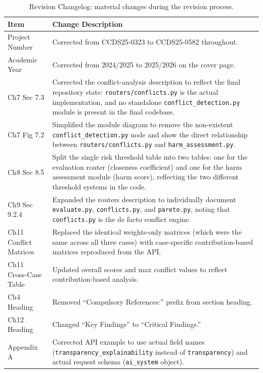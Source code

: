\begin{table}[H]
\centering
\caption{Revision Changelog: material changes during the revision process.}
\label{tab:changelog}
\begin{tabularx}{\textwidth}{@{}lX@{}}
\toprule
\textbf{Item} & \textbf{Change Description} \\
\midrule
Project Number & Corrected from CCDS25-0323 to CCDS25-0582 throughout. \\
\addlinespace
Academic Year & Corrected from 2024/2025 to 2025/2026 on the cover page. \\
\addlinespace
Ch7 Sec 7.3 & Corrected the conflict-analysis description to reflect the final repository state: \texttt{routers/conflicts.py} is the actual implementation, and no standalone \texttt{conflict\_detection.py} module is present in the final codebase. \\
\addlinespace
Ch7 Fig 7.2 & Simplified the module diagram to remove the non-existent \texttt{conflict\_detection.py} node and show the direct relationship between \texttt{routers/conflicts.py} and \texttt{harm\_assessment.py}. \\
\addlinespace
Ch8 Sec 8.5 & Split the single risk threshold table into two tables: one for the evaluation router (closeness coefficient) and one for the harm assessment module (harm score), reflecting the two different threshold systems in the code. \\
\addlinespace
Ch9 Sec 9.2.4 & Expanded the routers description to individually document \texttt{evaluate.py}, \texttt{conflicts.py}, and \texttt{pareto.py}, noting that \texttt{conflicts.py} is the de facto conflict engine. \\
\addlinespace
Ch11 Conflict Matrices & Replaced the identical weights-only matrices (which were the same across all three cases) with case-specific contribution-based matrices reproduced from the API. \\
\addlinespace
Ch11 Cross-Case Table & Updated overall scores and max conflict values to reflect contribution-based analysis. \\
\addlinespace
Ch4 Heading & Removed \enquote{Compulsory References:} prefix from section heading. \\
\addlinespace
Ch12 Heading & Changed \enquote{Key Findings} to \enquote{Critical Findings.} \\
\addlinespace
Appendix A & Corrected API example to use actual field names (\texttt{transparency\_explainability} instead of \texttt{transparency}) and actual request schema (\texttt{ai\_system} object). \\

\end{tabularx}
\end{table}
